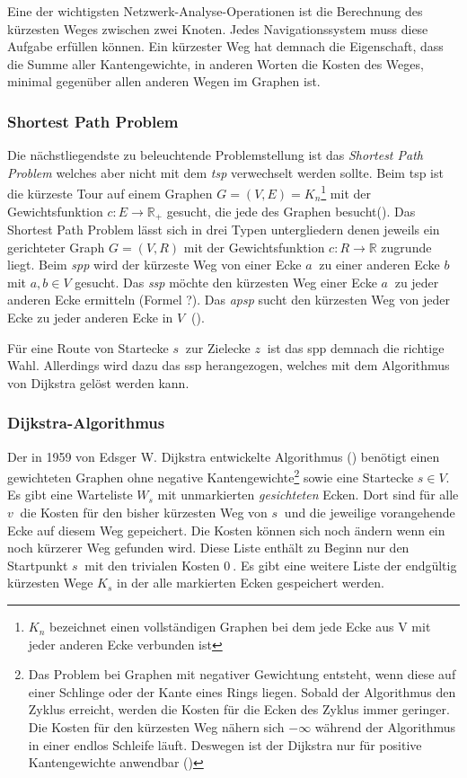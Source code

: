 \documentclass[12pt,a4paper]{article}
\begin{document}
Eine der wichtigsten Netzwerk-Analyse-Operationen ist die Berechnung des kürzesten Weges zwischen zwei Knoten. Jedes Navigationssystem muss diese Aufgabe erfüllen können. Ein kürzester Weg hat demnach die Eigenschaft, dass die Summe aller Kantengewichte, in anderen Worten die Kosten des Weges, minimal gegenüber allen anderen Wegen im Graphen ist.

\subsubsection{Shortest Path Problem}
Die nächstliegendste zu beleuchtende Problemstellung ist das \textit{Shortest Path Problem} welches aber nicht mit dem \textit{\gls{tsp}} verwechselt werden sollte. Beim \gls{tsp} ist die kürzeste Tour auf einem Graphen $G  = (V,E) = K_{n}$\footnote{$K_{n}$ bezeichnet einen vollständigen Graphen bei dem jede Ecke aus V mit jeder anderen Ecke verbunden ist} mit der Gewichtsfunktion $c: E \rightarrow \mathbb{R}_{+}$ gesucht, die jede des Graphen besucht(\cite[135]{algorithms}).
Das Shortest Path Problem lässt sich in drei Typen untergliedern denen jeweils ein gerichteter Graph $G = (V,R)$ mit der Gewichtsfunktion $c: R \rightarrow \mathbb{R}$ zugrunde liegt. Beim \textit{\gls{spp}} wird der kürzeste Weg von einer Ecke $a~$ zu einer anderen Ecke $b~$ mit $a,b\in V$ gesucht. Das \textit{\gls{ssp}} möchte den kürzesten Weg einer Ecke $a~$ zu jeder anderen Ecke ermitteln (Formel ?). Das \textit{\gls{apsp}} sucht den kürzesten Weg von jeder Ecke zu jeder anderen Ecke in $V~$ (\cite[169\psq]{algorithms}).

Für eine Route von Startecke $s~$ zur Zielecke $z~$ ist das \gls{spp} demnach die richtige Wahl. Allerdings wird dazu das \gls{ssp} herangezogen, welches mit dem Algorithmus von Dijkstra gelöst werden kann.


\subsubsection{Dijkstra-Algorithmus}
\label{sec:dijkstra}
Der in 1959 von Edsger W. Dijkstra entwickelte Algorithmus (\cite{dijkstra}) benötigt einen gewichteten Graphen ohne negative Kantengewichte\footnote{Das Problem bei Graphen mit negativer Gewichtung entsteht, wenn diese auf einer Schlinge oder der Kante eines Rings liegen. Sobald der Algorithmus den Zyklus erreicht, werden die Kosten für die Ecken des Zyklus immer geringer. Die Kosten für den kürzesten Weg nähern sich $-\infty $ während der Algorithmus in einer endlos Schleife läuft. Deswegen ist der Dijkstra nur für positive Kantengewichte anwendbar (\cite[194\psq]{kurt})} sowie eine Startecke $s \in V$. Es gibt eine Warteliste $W_{s}$ mit unmarkierten \textit{gesichteten} Ecken. Dort sind für alle $v~$ die Kosten für den bisher kürzesten Weg von $s~$ und die jeweilige vorangehende Ecke auf diesem Weg gepeichert. Die Kosten können sich noch ändern wenn ein noch kürzerer Weg gefunden wird. Diese Liste enthält zu Beginn nur den Startpunkt $s~$ mit den trivialen Kosten $0~$. Es gibt eine weitere Liste der endgültig kürzesten Wege $K_{s}$ in der alle markierten Ecken gespeichert werden.
\end{document}
